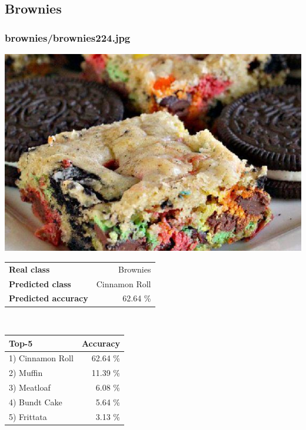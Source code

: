 \subsection{Brownies}
    
\subsubsection{brownies/brownies224.jpg}

\begin{minipage}[t]{0.4\textwidth}
	\vspace{0pt}
	\includegraphics[width=\linewidth]{images/evaluation-images/brownies/brownies224.jpg}
\end{minipage}
\hfill
\begin{minipage}[t]{0.5\textwidth}
	\vspace{0pt}\raggedright
	\begin{tabularx}{\textwidth}{X r}
		\small \textbf{Real class} & \small Brownies\\
		\small \textbf{Predicted class} & \small Cinnamon Roll\\
		\small \textbf{Predicted accuracy} & \small 62.64 \%
    \end{tabularx}\\
    
    \vspace{6pt}
	\begin{tabularx}{\textwidth}{X r}
        \small \textbf{Top-5} & \small \textbf{Accuracy} \\
        \hline
		\small 1) Cinnamon Roll & \small 62.64 \%\\\small 2) Muffin & \small 11.39 \%\\\small 3) Meatloaf & \small 6.08 \%\\\small 4) Bundt Cake & \small 5.64 \%\\\small 5) Frittata & \small 3.13 \%
    \end{tabularx}
\end{minipage}
    
